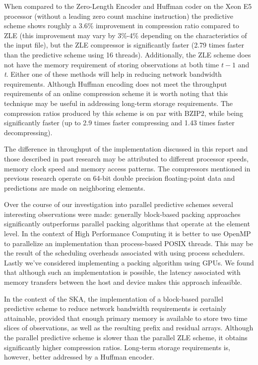 When compared to the Zero-Length Encoder and Huffman coder on the Xeon E5 processor (without a leading zero count machine instruction) the predictive scheme shows roughly a 3.6\% improvement
in compression ratio compared to ZLE (this improvement may vary by 3\%-4\% depending on the characteristics of the input file), but the ZLE compressor is significantly faster (2.79 times faster than
the predictive scheme using 16 threads). Additionally, the ZLE scheme does not have the memory requirement of storing observations at both time $t-1$ and \textit{t}. Either one
of these methods will help in reducing network bandwidth requirements. Although Huffman encoding does not meet the throughput requirements of an online compression scheme it is worth noting that 
this technique may be useful in addressing long-term storage requirements. The compression ratios produced by this scheme is on par with BZIP2, while being significantly faster (up to 2.9 times faster compressing
and 1.43 times faster decompressing).

The difference in throughput of the implementation discussed in this report and those described in past research may be attributed to different processor speeds, memory clock speed
and memory access patterns. The compressors mentioned in previous research operate on 64-bit double precision floating-point data and predictions are made on neighboring elements.

Over the course of our investigation into parallel predictive schemes several interesting observations were made: generally block-based packing approaches significantly outperforms parallel
packing algorithms that operate at the element level. In the context of High Performance Computing it is better to use OpenMP to parallelize an implementation than process-based
POSIX threads. This may be the result of the scheduling overheads associated with using process schedulers. Lastly we've considered implementing a packing algorithm using
GPUs. We found that although such an implementation is possible, the latency associated with memory transfers between the host and device makes this approach infeasible.

In the context of the SKA, the implementation of a block-based parallel predictive scheme to reduce network bandwidth requirements is certainly attainable, provided that 
enough primary memory is available to store two time slices of observations, as well as the resulting prefix and residual arrays. Although the parallel predictive scheme
is slower than the parallel ZLE scheme, it obtains significantly higher compression ratios. Long-term storage requirements is, however, better addressed by a Huffman
encoder.

